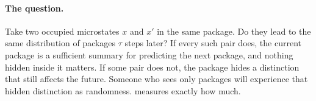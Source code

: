 \paragraph{The question.} Take two occupied microstates $x$ and $x'$ in the same package. Do they lead to the same distribution of packages $\tau$ steps later? If every such pair does, the current package is a sufficient summary for predicting the next package, and nothing hidden inside it matters. If some pair does not, the package hides a distinction that still affects the future. Someone who sees only packages will experience that hidden distinction as randomness.  measures exactly how much.
